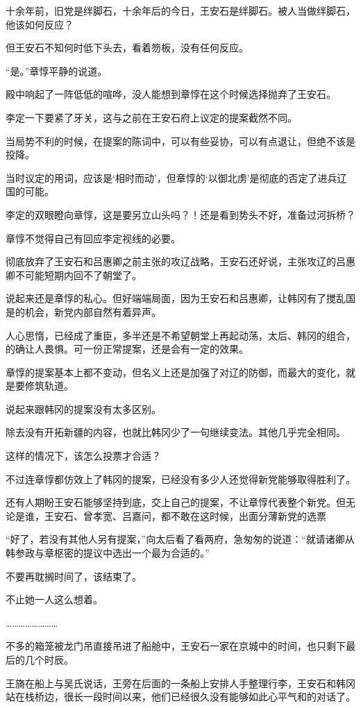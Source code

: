 十余年前，旧党是绊脚石，十余年后的今日，王安石是绊脚石。被人当做绊脚石，他该如何反应？

但王安石不知何时低下头去，看着笏板，没有任何反应。

“是。”章惇平静的说道。

殿中响起了一阵低低的喧哗，没人能想到章惇在这个时候选择抛弃了王安石。

李定一下要紧了牙关，这与之前在王安石府上议定的提案截然不同。

当局势不利的时候，在提案的陈词中，可以有些妥协，可以有点退让，但绝不该是投降。

当时议定的用词，应该是‘相时而动’，但章惇的‘以御北虏’是彻底的否定了进兵辽国的可能。

李定的双眼瞪向章惇，这是要另立山头吗？！还是看到势头不好，准备过河拆桥？

章惇不觉得自己有回应李定视线的必要。

彻底放弃了王安石和吕惠卿之前主张的攻辽战略，王安石还好说，主张攻辽的吕惠卿不可能短期内回不了朝堂了。

说起来还是章惇的私心。但好端端局面，因为王安石和吕惠卿，让韩冈有了搅乱国是的机会，新党内部自然有着异声。

人心思惰，已经成了重臣，多半还是不希望朝堂上再起动荡，太后、韩冈的组合，的确让人畏惧。可一份正常提案，还是会有一定的效果。

章惇的提案基本上都不变动，但名义上还是加强了对辽的防御，而最大的变化，就是要修筑轨道。

说起来跟韩冈的提案没有太多区别。

除去没有开拓新疆的内容，也就比韩冈少了一句继续变法。其他几乎完全相同。

这样的情况下，该怎么投票才合适？

不过连章惇都仿效上了韩冈的提案，已经没有多少人还觉得新党能够取得胜利了。

还有人期盼王安石能够坚持到底，交上自己的提案，不让章惇代表整个新党。但无论是谁，王安石、曾孝宽、吕嘉问，都不敢在这时候，出面分薄新党的选票

“好了，若没有其他人另有提案，”向太后看了看两府，急匆匆的说道：“就请诸卿从韩参政与章枢密的提议中选出一个最为合适的。”

不要再耽搁时间了，该结束了。

不止她一人这么想着。

……………………

不多的箱笼被龙门吊直接吊进了船舱中，王安石一家在京城中的时间，也只剩下最后的几个时辰。

王旖在船上与吴氏说话，王旁在后面的一条船上安排人手整理行李，王安石和韩冈站在栈桥边，很长一段时间以来，他们已经很久没有能够如此心平气和的对话了。

